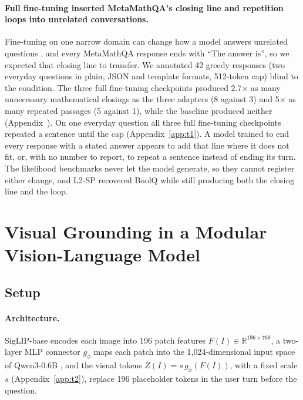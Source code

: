 \documentclass{article}
\begin{document}
\paragraph{Full fine-tuning inserted MetaMathQA's closing line and repetition loops into unrelated conversations.}
Fine-tuning on one narrow domain can change how a model answers unrelated questions \citep{emergent}, and every MetaMathQA response ends with ``The answer is'', so we expected that closing line to transfer. We annotated 42 greedy responses (two everyday questions in plain, JSON and template formats, 512-token cap) blind to the condition. The three full fine-tuning checkpoints produced 2.7$\times$ as many unnecessary mathematical closings as the three adapters (8 against 3) and 5$\times$ as many repeated passages (5 against 1), while the baseline produced neither (Appendix~). On one everyday question all three full fine-tuning checkpoints repeated a sentence until the cap (Appendix~\ref{app:t1}). A model trained to end every response with a stated answer appears to add that line where it does not fit, or, with no number to report, to repeat a sentence instead of ending its turn. The likelihood benchmarks never let the model generate, so they cannot register either change, and L2-SP recovered BoolQ while still producing both the closing line and the loop.

\section{Visual Grounding in a Modular Vision-Language Model}
\label{sec:t2}
\subsection{Setup}
\paragraph{Architecture.} SigLIP-base \citep{siglip} encodes each image into 196 patch features $F(I)\in\mathbb R^{196\times768}$, a two-layer MLP connector $g_\phi$ maps each patch into the 1,024-dimensional input space of Qwen3-0.6B \citep{qwen3}, and the visual tokens $Z(I)=s\,g_\phi(F(I))$, with a fixed scale $s$ (Appendix~\ref{app:t2}), replace 196 placeholder tokens in the user turn before the question.
\end{document}
